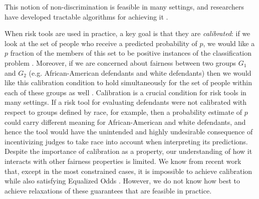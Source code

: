 This notion of non-discrimination is feasible in many settings,
and researchers have developed tractable algorithms for achieving it \cite{hardt2016equality,goh2016satisfying,zafar2017fairness,woodworth2017learning}.
%

When risk tools are used in practice, a key goal is that they are
{\em calibrated}: if we look at the set of people who receive a predicted probability
of $p$, we would like a $p$ fraction of the members of this set to
be positive instances of the classification problem \cite{dawid1982well}.
Moreover, if we are concerned about fairness between two groups
$G_1$ and $G_2$ (e.g. African-American defendants and white defendants)
then we would like this calibration condition
to hold simultaneously for the set
of people within each of these groups as well
\cite{flores-re-propublica-fair}.
%
Calibration is a crucial condition for risk tools in many settings.
If a risk tool for
evaluating defendants were not calibrated with respect to groups
defined by race, for example, then a probability estimate of $p$
could carry different meaning for African-American and white defendants,
and hence the tool would have the unintended and highly undesirable
consequence of incentivizing judges to take race into account when
interpreting its predictions.
%
Despite the importance of calibration as a property,
our understanding of how it interacts
with other fairness properties is limited.
We know from recent work that, except in the most constrained
cases, it is impossible to achieve calibration while also
satisfying Equalized Odds
\citep{kleinberg2016inherent,chouldechova2017fair}.
However, we do not know how best to achieve relaxations of these guarantees
that are feasible in practice.


